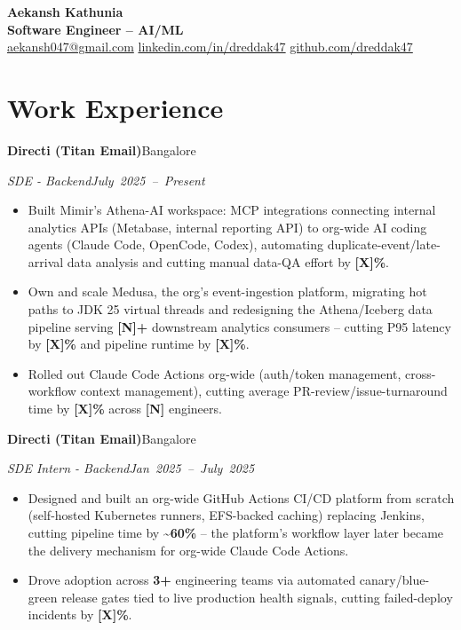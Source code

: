 \documentclass[10pt,letterpaper]{article}
\newcommand{\resumeHeading}[4]{%
  \par\noindent\textbf{#1}\hfill\mbox{#2}\par
  \noindent\textit{#3}\hfill\mbox{\textit{#4}}\par
}
\begin{document}
\begin{center}
  {\LARGE\bfseries Aekansh Kathunia}\\[-1pt]
  \textbf{Software Engineer -- AI/ML}\\[1pt]

  \href{mailto:aekansh047@gmail.com}{aekansh047@gmail.com}
  \enspace\textbar\enspace \href{https://www.linkedin.com/in/dreddak47}{linkedin.com/in/dreddak47}
  \enspace\textbar\enspace
  \href{https://github.com/dreddak47}{github.com/dreddak47}
\end{center}
\vspace{-10pt}

\section{Work Experience}
\resumeHeading{Directi (Titan Email)}{Bangalore}{SDE - Backend}{July 2025 -- Present}
\begin{itemize}
\item Built Mimir's Athena-AI workspace: MCP integrations connecting internal analytics APIs (Metabase, internal reporting API) to org-wide AI coding agents (Claude Code, OpenCode, Codex), automating duplicate-event/late-arrival data analysis and cutting manual data-QA effort by \textbf{[X]\%}. %
\item Own and scale Medusa, the org's event-ingestion platform, migrating hot paths to JDK 25 virtual threads and redesigning the Athena/Iceberg data pipeline serving \textbf{[N]+} downstream analytics consumers -- cutting P95 latency by \textbf{[X]\%} and pipeline runtime by \textbf{[X]\%}. %
\item Rolled out Claude Code Actions org-wide (auth/token management, cross-workflow context management), cutting average PR-review/issue-turnaround time by \textbf{[X]\%} across \textbf{[N]} engineers. %
\end{itemize}

\resumeHeading{Directi (Titan Email)}{Bangalore}{SDE Intern - Backend}{Jan 2025 -- July 2025}
\begin{itemize}
\item Designed and built an org-wide GitHub Actions CI/CD platform from scratch (self-hosted Kubernetes runners, EFS-backed caching) replacing Jenkins, cutting pipeline time by \textbf{\textasciitilde 60\%} -- the platform's workflow layer later became the delivery mechanism for org-wide Claude Code Actions.
\item Drove adoption across \textbf{3+} engineering teams via automated canary/blue-green release gates tied to live production health signals, cutting failed-deploy incidents by \textbf{[X]\%}. %
\end{itemize}
\end{document}
